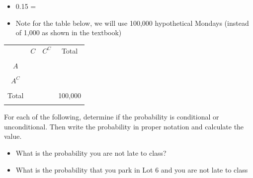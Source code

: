 \documentclass[
]{report}
\providecommand{\tightlist}{%
  \setlength{\itemsep}{0pt}\setlength{\parskip}{0pt}}
\begin{document}
\begin{itemize}
\tightlist
\item
  0.15 =
\end{itemize}

\vspace{0.1in}

\begin{itemize}
\tightlist
\item
  Note for the table below, we will use 100,000 hypothetical Mondays (instead of 1,000 as shown in the textbook)
\end{itemize}


\begin{center}
\begin{tabular}{|c|c|c|c|} \hline
\hspace{0.8in} & \hspace{0.35in} $C$ \hspace{.35in} & \hspace{0.35in} $C^C$  \hspace{0.35in} & \hspace{0.3in} Total \hspace{0.3in} \\ 
& & & \\ \hline
$A$& & & \\ 
& & & \\ \hline
$A^C$& & & \\ 
& & & \\ \hline
Total & & & 100,000 \\ 
& & & \\ \hline
\end{tabular}
\end{center}
\vspace{.1in}

For each of the following, determine if the probability is conditional or unconditional. Then write the probability in proper notation and calculate the value.

\begin{itemize}
\tightlist
\item
  What is the probability you are not late to class?
\end{itemize}

\vspace{1in}

\begin{itemize}
\tightlist
\item
  What is the probability that you park in Lot 6 and you are not late to class
\end{itemize}
\end{document}
